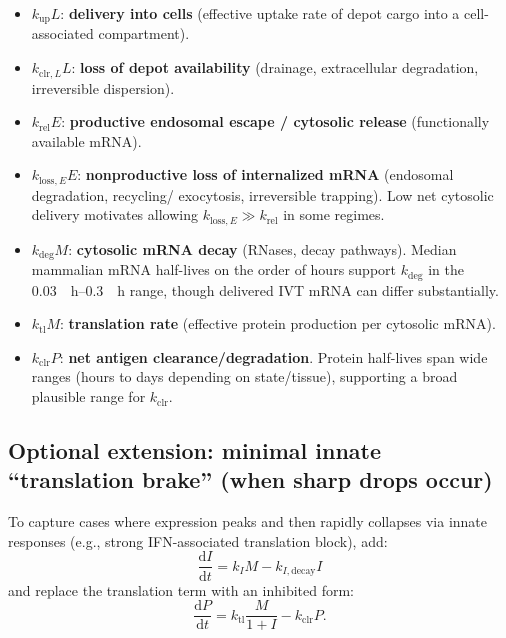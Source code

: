 \begin{itemize}
    \item $k_{\mathrm{up}}L$: \textbf{delivery into cells} (effective uptake rate of depot cargo into a cell-associated compartment).
    \item $k_{\mathrm{clr},L}L$: \textbf{loss of depot availability} (drainage, extracellular degradation, irreversible dispersion).
    \item $k_{\mathrm{rel}}E$: \textbf{productive endosomal escape / cytosolic release} (functionally available mRNA).
    \item $k_{\mathrm{loss},E}E$: \textbf{nonproductive loss of internalized mRNA} (endosomal degradation, recycling/ exocytosis, irreversible trapping). Low net cytosolic delivery motivates allowing $k_{\mathrm{loss},E} \gg k_{\mathrm{rel}}$ in some regimes. \parencite{Pei2025EndosomalEscapeLNP}
    \item $k_{\mathrm{deg}}M$: \textbf{cytosolic mRNA decay} (RNases, decay pathways). Median mammalian mRNA half-lives on the order of hours support $k_{\mathrm{deg}}$ in the \qtyrange{0.03}{0.3}{\per \hour} range, though delivered IVT mRNA can differ substantially. \parencite{Sharova2009mRNAHalfLifeESC}
    \item $k_{\mathrm{tl}}M$: \textbf{translation rate} (effective protein production per cytosolic mRNA).
    \item $k_{\mathrm{clr}}P$: \textbf{net antigen clearance/degradation}. Protein half-lives span wide ranges (hours to days depending on state/tissue), supporting a broad plausible range for $k_{\mathrm{clr}}$. \parencite{Toyama2013ProteinHomeostasis}
\end{itemize}

\subsection*{Optional extension: minimal innate ``translation brake'' (when sharp drops occur)}

To capture cases where expression peaks and then rapidly collapses via innate responses (e.g., strong IFN-associated translation block), add:
\begin{equation}
\frac{\mathrm{d}I}{\mathrm{d}t} = k_I M - k_{I,\mathrm{decay}} I
\end{equation}
and replace the translation term with an inhibited form:
\begin{equation}
\frac{\mathrm{d}P}{\mathrm{d}t} = k_{\mathrm{tl}}\frac{M}{1+I} - k_{\mathrm{clr}}P.
\end{equation}

